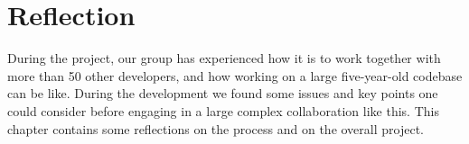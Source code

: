 \chapter{Reflection}
\label{cha:reflection}

During the \giraf project, our group has experienced how it is to work together with more than 50 other developers, and how working on a large five-year-old codebase can be like. During the development we found some issues and key points one could consider before engaging in a large complex collaboration like this. This chapter contains some reflections on the process and on the overall project.


